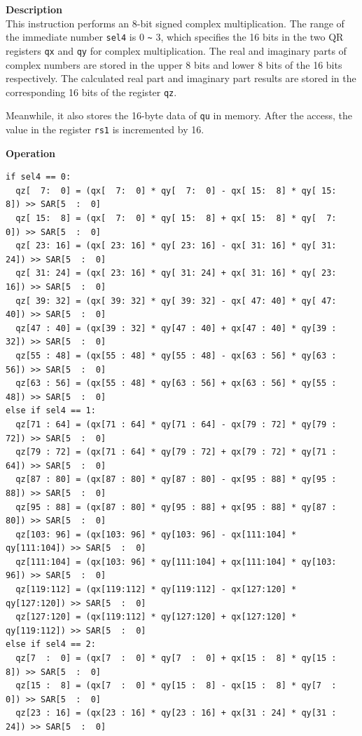 \textbf{Description}\\
This instruction performs an 8-bit signed complex multiplication. The range of the immediate number \lstinline{sel4} is 0 \verb+~+ 3, which specifies the 16 bits in the two QR registers \lstinline{qx} and \lstinline{qy} for complex multiplication. The real and imaginary parts of complex numbers are stored in the upper 8 bits and lower 8 bits of the 16 bits respectively. The calculated real part and imaginary part results are stored in the corresponding 16 bits of the register \lstinline{qz}.

Meanwhile, it also stores the 16-byte data of \lstinline{qu} in memory. After the access, the value in the register \lstinline{rs1} is incremented by 16.

\textbf{Operation}\\
\begin{lstlisting}
if sel4 == 0:
  qz[  7:  0] = (qx[  7:  0] * qy[  7:  0] - qx[ 15:  8] * qy[ 15:  8]) >> SAR[5  :  0]
  qz[ 15:  8] = (qx[  7:  0] * qy[ 15:  8] + qx[ 15:  8] * qy[  7:  0]) >> SAR[5  :  0]
  qz[ 23: 16] = (qx[ 23: 16] * qy[ 23: 16] - qx[ 31: 16] * qy[ 31: 24]) >> SAR[5  :  0]
  qz[ 31: 24] = (qx[ 23: 16] * qy[ 31: 24] + qx[ 31: 16] * qy[ 23: 16]) >> SAR[5  :  0]
  qz[ 39: 32] = (qx[ 39: 32] * qy[ 39: 32] - qx[ 47: 40] * qy[ 47: 40]) >> SAR[5  :  0]
  qz[47 : 40] = (qx[39 : 32] * qy[47 : 40] + qx[47 : 40] * qy[39 : 32]) >> SAR[5  :  0]
  qz[55 : 48] = (qx[55 : 48] * qy[55 : 48] - qx[63 : 56] * qy[63 : 56]) >> SAR[5  :  0]
  qz[63 : 56] = (qx[55 : 48] * qy[63 : 56] + qx[63 : 56] * qy[55 : 48]) >> SAR[5  :  0]
else if sel4 == 1:
  qz[71 : 64] = (qx[71 : 64] * qy[71 : 64] - qx[79 : 72] * qy[79 : 72]) >> SAR[5  :  0]
  qz[79 : 72] = (qx[71 : 64] * qy[79 : 72] + qx[79 : 72] * qy[71 : 64]) >> SAR[5  :  0]
  qz[87 : 80] = (qx[87 : 80] * qy[87 : 80] - qx[95 : 88] * qy[95 : 88]) >> SAR[5  :  0]
  qz[95 : 88] = (qx[87 : 80] * qy[95 : 88] + qx[95 : 88] * qy[87 : 80]) >> SAR[5  :  0]
  qz[103: 96] = (qx[103: 96] * qy[103: 96] - qx[111:104] * qy[111:104]) >> SAR[5  :  0]
  qz[111:104] = (qx[103: 96] * qy[111:104] + qx[111:104] * qy[103: 96]) >> SAR[5  :  0]
  qz[119:112] = (qx[119:112] * qy[119:112] - qx[127:120] * qy[127:120]) >> SAR[5  :  0]
  qz[127:120] = (qx[119:112] * qy[127:120] + qx[127:120] * qy[119:112]) >> SAR[5  :  0]
else if sel4 == 2:
  qz[7  :  0] = (qx[7  :  0] * qy[7  :  0] + qx[15 :  8] * qy[15 :  8]) >> SAR[5  :  0]
  qz[15 :  8] = (qx[7  :  0] * qy[15 :  8] - qx[15 :  8] * qy[7  :  0]) >> SAR[5  :  0]
  qz[23 : 16] = (qx[23 : 16] * qy[23 : 16] + qx[31 : 24] * qy[31 : 24]) >> SAR[5  :  0]

\end{lstlisting}
